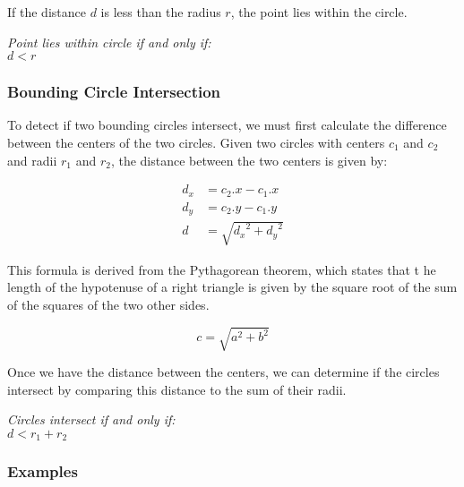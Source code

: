 If the distance $d$ is less than the radius $r$, the point lies within the
circle.

\begin{center}
    \textit{Point lies within circle if and only if:}\\
    $d < r$
\end{center}

\subsubsection{Bounding Circle Intersection}

To detect if two bounding circles intersect, we must first calculate the
difference between the centers of the two circles. Given two circles with
centers $c_1$ and $c_2$ and radii $r_1$ and $r_2$, the distance between the two
centers is given by:

\begin{equation}
    \begin{aligned}
        d_x & = c_2.x - c_1.x            \\
        d_y & = c_2.y - c_1.y            \\
        d   & = \sqrt{{d_x}^2 + {d_y}^2}
    \end{aligned}
\end{equation}

This formula is derived from the Pythagorean theorem, which states that t he
length of the hypotenuse of a right triangle is given by the square root of the
sum of the squares of the two other sides.

\begin{equation}
    c = \sqrt{a^2 + b^2}
\end{equation}

Once we have the distance between the centers, we can determine if the circles
intersect by comparing this distance to the sum of their radii.

\begin{center}
    \textit{Circles intersect if and only if:}\\
    $d < r_1 + r_2$
\end{center}

\subsubsection{Examples}


